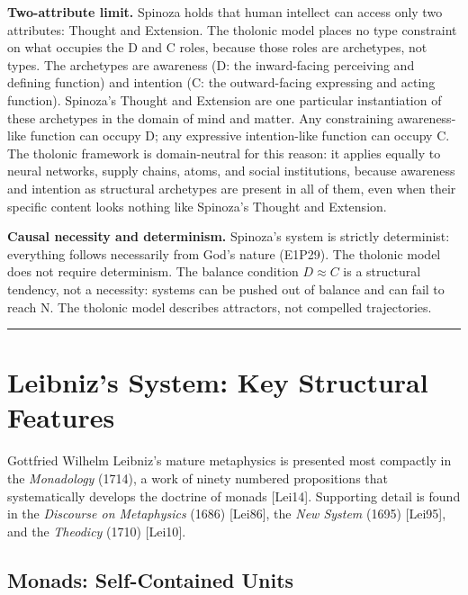 \documentclass[12pt]{article}
\begin{document}
\textbf{Two-attribute limit.} Spinoza holds that human intellect can
access only two attributes: Thought and Extension. The tholonic model
places no type constraint on what occupies the D and C roles, because
those roles are archetypes, not types. The archetypes are awareness (D:
the inward-facing perceiving and defining function) and intention (C:
the outward-facing expressing and acting function). Spinoza's Thought
and Extension are one particular instantiation of these archetypes in
the domain of mind and matter. Any constraining awareness-like function
can occupy D; any expressive intention-like function can occupy C. The
tholonic framework is domain-neutral for this reason: it applies equally
to neural networks, supply chains, atoms, and social institutions,
because awareness and intention as structural archetypes are present in
all of them, even when their specific content looks nothing like
Spinoza's Thought and Extension.

\textbf{Causal necessity and determinism.} Spinoza's system is strictly
determinist: everything follows necessarily from God's nature (E1P29).
The tholonic model does not require determinism. The balance condition
\(D \approx C\) is a structural tendency, not a necessity: systems can
be pushed out of balance and can fail to reach N. The tholonic model
describes attractors, not compelled trajectories.

\begin{center}\rule{0.5\linewidth}{0.5pt}\end{center}

\section{Leibniz's System: Key Structural Features}\label{leibnizs-system-key-structural-features}

Gottfried Wilhelm Leibniz's mature metaphysics is presented most
compactly in the \emph{Monadology} (1714), a work of ninety numbered
propositions that systematically develops the doctrine of monads
{[}Lei14{]}. Supporting detail is found in the \emph{Discourse on
Metaphysics} (1686) {[}Lei86{]}, the \emph{New System} (1695)
{[}Lei95{]}, and the \emph{Theodicy} (1710) {[}Lei10{]}.

\subsection{Monads: Self-Contained Units}\label{monads-self-contained-units}
\end{document}
